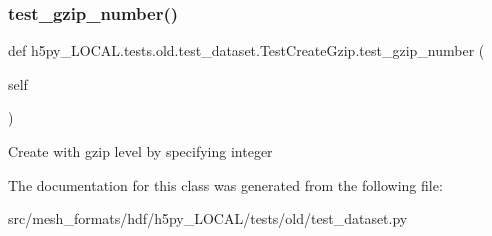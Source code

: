 \subsubsection{\texorpdfstring{test\+\_\+gzip\+\_\+number()}{test\_gzip\_number()}}
{\footnotesize\ttfamily def h5py\+\_\+\+L\+O\+C\+A\+L.\+tests.\+old.\+test\+\_\+dataset.\+Test\+Create\+Gzip.\+test\+\_\+gzip\+\_\+number (\begin{DoxyParamCaption}\item[{}]{self }\end{DoxyParamCaption})}

\begin{DoxyVerb}Create with gzip level by specifying integer \end{DoxyVerb}
 

The documentation for this class was generated from the following file\+:\begin{DoxyCompactItemize}
\item 
src/mesh\+\_\+formats/hdf/h5py\+\_\+\+L\+O\+C\+A\+L/tests/old/test\+\_\+dataset.\+py\end{DoxyCompactItemize}
